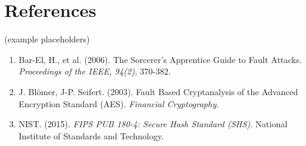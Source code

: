 \documentclass[11pt, a4paper]{article}
\begin{document}
\section*{References}
(example placeholders)
\begin{enumerate}
    \item Bar-El, H., et al. (2006). The Sorcerer's Apprentice Guide to Fault Attacks. \textit{Proceedings of the IEEE, 94(2)}, 370-382.
    \item J. Bl\"omer, J-P. Seifert. (2003). Fault Based Cryptanalysis of the Advanced Encryption Standard (AES). \textit{Financial Cryptography}.
    \item NIST. (2015). \textit{FIPS PUB 180-4: Secure Hash Standard (SHS)}. National Institute of Standards and Technology.
\end{enumerate}
\end{document}
